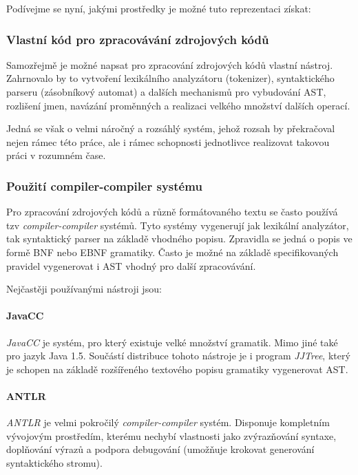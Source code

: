 Podívejme se nyní, jakými prostředky je možné tuto reprezentaci získat:

\subsubsection{Vlastní kód pro zpracovávání zdrojových kódů}
Samozřejmě je možné napsat pro zpracování zdrojových kódů vlastní nástroj. Zahrnovalo by to vytvoření lexikálního analyzátoru (tokenizer), syntaktického parseru (zásobníkový automat) a dalších mechanismů pro vybudování AST, rozlišení jmen, navázání proměnných a realizaci velkého množství dalších operací.

Jedná se však o velmi náročný a rozsáhlý systém, jehož rozsah by překračoval nejen rámec této práce, ale i rámec schopnosti jednotlivce realizovat takovou práci v rozumném čase.

\subsubsection{Použití compiler-compiler systému}
Pro zpracování zdrojových kódů a různě formátovaného textu se často používá tzv \emph{compiler-compiler} systémů. Tyto systémy vygenerují jak lexikální analyzátor, tak syntaktický parser na základě vhodného popisu. Zpravidla se jedná o popis ve formě BNF nebo EBNF gramatiky. Často je možné na základě specifikovaných pravidel vygenerovat i AST vhodný pro další zpracovávání.

Nejčastěji používanými nástroji jsou:

\paragraph{JavaCC} \emph{JavaCC} \cite{parsertools:javacc} je systém, pro který existuje velké množství gramatik. Mimo jiné také pro jazyk Java 1.5. Součástí distribuce tohoto nástroje je i program \emph{JJTree}, který je schopen na základě rozšířeného textového popisu gramatiky vygenerovat AST.

\paragraph{ANTLR} \emph{ANTLR} \cite{parsertools:antlr} je velmi pokročilý \emph{compiler-compiler} systém. Disponuje kompletním vývojovým prostředím, kterému nechybí vlastnosti jako zvýrazňování syntaxe, doplňování výrazů a podpora debugování (umožňuje krokovat generování syntaktického stromu).

